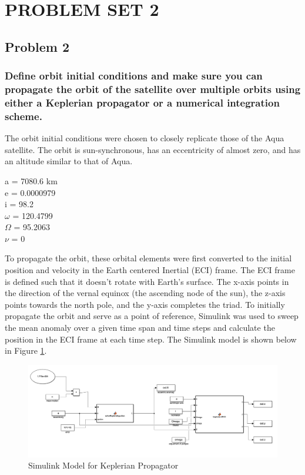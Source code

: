 \section{\Large PROBLEM SET 2}
\subsection{Problem 2}

\subsubsection{Define orbit initial conditions and make sure you can propagate the orbit of the satellite over multiple orbits using either a Keplerian propagator or a numerical integration scheme.}

The orbit initial conditions were chosen to closely replicate those of the Aqua satellite. The orbit is sun-synchronous, has an eccentricity of almost zero, and has an altitude similar to that of Aqua.

\begin{center}
    a = 7080.6 km \\
    e = 0.0000979 \\
    i = 98.2\degree \\
    $\omega$ = 120.4799\degree \\
    $\Omega$ = 95.2063\degree \\
    $\nu$ = 0\degree
\end{center}

To propagate the orbit, these orbital elements were first converted to the initial position and velocity in the Earth centered Inertial (ECI) frame. The ECI frame is defined such that it doesn't rotate with Earth's surface. The x-axis points in the direction of the vernal equinox (the ascending node of the sun), the z-axis points towards the north pole, and the y-axis completes the triad. To initially propagate the orbit and serve as a point of reference, Simulink was used to sweep the mean anomaly over a given time span and time steps and calculate the position in the ECI frame at each time step. The Simulink model is shown below in Figure \ref{fig:simulink-prop}.

\begin{figure}[H]
    \centering
    \includegraphics[width = 15.5cm]{Images/simulink_prop.png}
    \caption{Simulink Model for Keplerian Propagator}
    \label{fig:simulink-prop}
\end{figure}

